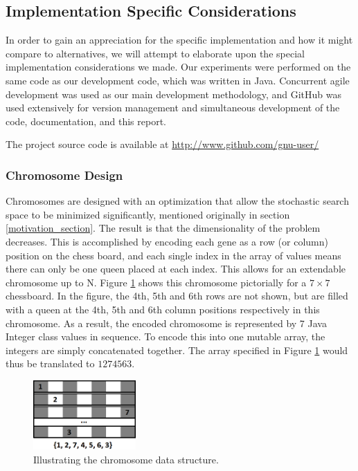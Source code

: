 \documentclass{sig-alternate}
\begin{document}
\subsection{Implementation Specific Considerations}
In order to gain an appreciation for the specific implementation and how it might compare to alternatives, we will attempt to elaborate upon the special implementation considerations we made. Our experiments were performed on the same code as our development code, which was written in Java. Concurrent agile development was used as our main development methodology, and GitHub was used extensively for version management and simultaneous development of the code, documentation, and this report. 

The project source code is available at \url{http://www.github.com/gnu-user/}

\newpage
\subsubsection{Chromosome Design}

Chromosomes are designed with an optimization that allow the stochastic search space to be minimized significantly, mentioned originally in section \ref{motivation_section}. The result is that the dimensionality of the problem decreases. This is accomplished by encoding each gene as a row (or column) position on the chess board, and each single index in the array of values means there can only be one queen placed at each index. This allows for an extendable chromosome up to N. Figure \ref{fig:chromosome} shows this chromosome pictorially for a $7 \times 7$ chessboard. In the figure, the 4th, 5th and 6th rows are not shown, but are filled with a queen at the 4th, 5th and 6th column positions respectively in this chromosome. As a result, the encoded chromosome is represented by 7 Java Integer class values in sequence. To encode this into one mutable array, the integers are simply concatenated together. The array specified in Figure \ref{fig:chromosome} would thus be translated to $1274563$.

\begin{figure}[h]
\centering
\includegraphics[width=0.35\textwidth]{chromosome.png}
\vspace{-12pt}
\caption{Illustrating the chromosome data structure.}
\label{fig:chromosome}
\end{figure}
\end{document}

